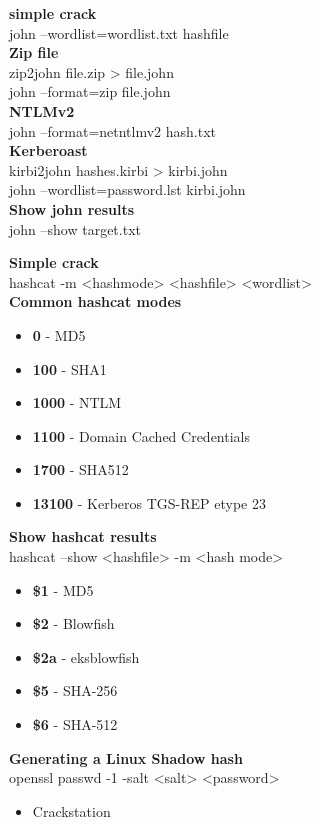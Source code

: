 \documentclass[a4paper,10pt]{article}
\begin{document}
\begin{multicols}{2}
\begin{tcolorbox}[breakable,title=john]
\textbf{simple crack}\\
john --wordlist=wordlist.txt hashfile\\
\textbf{Zip file}\\
zip2john file.zip > file.john\\
john --format=zip file.john\\
\textbf{NTLMv2}\\
john --format=netntlmv2 hash.txt\\
\textbf{Kerberoast}\\
kirbi2john hashes.kirbi > kirbi.john\\
john --wordlist=password.lst kirbi.john\\
\textbf{Show john results}\\
john --show target.txt
\end{tcolorbox}
\begin{tcolorbox}[breakable,title=hashcat]
\textbf{Simple crack}\\ hashcat -m <hashmode> <hashfile> <wordlist>\\
\textbf{Common hashcat modes}
\vspace{-1em}
\begin{itemize}
	\itemsep0em
	\item \textbf{0} - MD5
	\item \textbf{100} - SHA1
	\item \textbf{1000} - NTLM
	\item \textbf{1100} - Domain Cached Credentials
	\item \textbf{1700} - SHA512
	\item \textbf{13100} - Kerberos TGS-REP etype 23
\end{itemize}
\textbf{Show hashcat results}\\hashcat --show <hashfile> -m <hash mode>
\end{tcolorbox}
\begin{tcolorbox}[breakable,title=Linux shadow hashes]
	\begin{itemize}
		\itemsep0em
		\item	\textbf{\$1} - MD5
		\item \textbf{\$2} - Blowfish
		\item \textbf{\$2a} - eksblowfish
		\item \textbf{\$5} - SHA-256
		\item \textbf{\$6} - SHA-512
	\end{itemize}
\textbf{Generating a Linux Shadow hash}\\
openssl passwd -1 -salt <salt> <password>
\end{tcolorbox}
\begin{tcolorbox}[breakable,title=online hash crackers]
\begin{itemize}
	\itemsep0em
	\item Crackstation
\end{itemize}
\end{tcolorbox}
\end{multicols}
\end{document}
